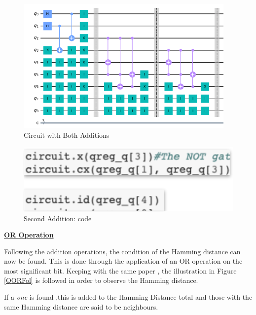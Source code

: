 \begin{figure}[H]
      \centering
      \includegraphics[scale=0.56]{background/2ndAdd.png}
      \caption{Circuit with Both Additions}
      \label{QADDFul}
\end{figure}

\begin{figure}[H]
      \centering
      \includegraphics[scale=0.4]{background/AddCode.png}
      \caption{Second Addition: code}
      \label{QADD2}
\end{figure}



\vspace{0.4cm}
\textbf{\underline{OR Operation}}
\vspace{0.1cm}

Following the addition operations, the condition of the Hamming distance can now be found. This is done through the application of an OR operation on the most significant bit. %
 Keeping with the same paper \citep{Kaye}, the illustration in Figure \ref{QORFol} is followed in order to observe the Hamming distance.

If a \emph{one} is found ,this is added to the Hamming Distance total and those with the same Hamming distance are said to be neighbours.

